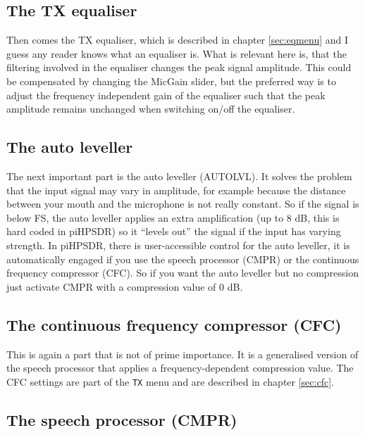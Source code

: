 \documentclass[12pt]{book}
\def\bltt#1{\texttt{\color{blue}#1}}
\def\pH{pi\-HPSDR\xspace}
\begin{document}
\subsection{The TX equaliser}

Then comes the TX equaliser, which is described in chapter \ref{sec:eqmenu} and I guess any reader knows what
an equaliser is. What is relevant here is, that the filtering
involved in the equaliser changes the peak signal amplitude. This could be compensated
by changing the MicGain slider, but the preferred way is to adjust the frequency independent gain
of the equaliser such that the peak amplitude remains unchanged when switching on/off the equaliser.

\subsection{The auto leveller}

The next important part is the auto leveller (AUTOLVL). It solves the problem that the input
signal may vary in amplitude, for example because the distance between your mouth and the microphone is
not really constant. So if the signal is below FS, the auto leveller applies an extra amplification (up
to 8 dB, this is hard coded in \pH) so it ``levels out'' the signal if the input has varying strength.
In \pH, there is user-accessible control for the auto leveller, it is automatically engaged if you
use the speech processor (CMPR) or the continuous frequency compressor (CFC).  So if you want the auto
leveller but no compression just activate CMPR with a compression value of 0 dB.

\subsection{The continuous frequency compressor (CFC)}

This is again a part that is not of prime importance. It is a generalised version of the speech processor
that applies a frequency-dependent compression value. The CFC settings are part of the \bltt{TX} menu
and are described in chapter \ref{sec:cfc}.

\subsection{The speech processor (CMPR)}
\end{document}
